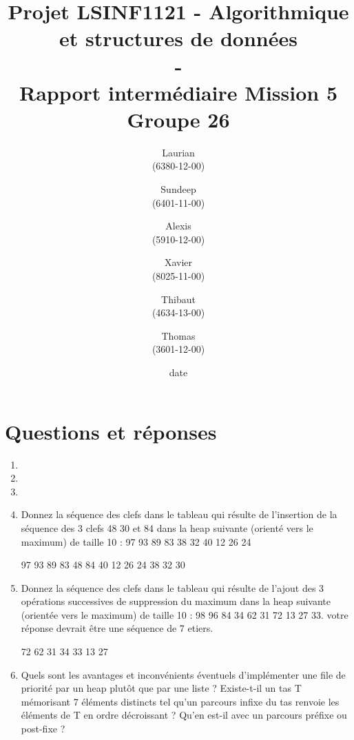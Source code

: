 \documentclass[11pt]{article}
\title{\textbf{Projet LSINF1121 -  Algorithmique et structures de données\\ - \\ Rapport intermédiaire Mission 5} \\ {\large Groupe 26}}
\author{Laurian \bsc{Detiffe} \\(6380-12-00)\and Sundeep \bsc{Dhillon} \\(6401-11-00)\and Alexis \bsc{Macq} \\ (5910-12-00) \and Xavier \bsc{Pérignon} \\ (8025-11-00)\and Thibaut \bsc{Piquard}\\(4634-13-00)\and Thomas \bsc{Wyckmans} \\ (3601-12-00)}
\date{date}
\date{\vspace*{25mm}
\texttt{[image: logo.jpg]}\\
		\vspace*{30mm}
		\begin{center}
		Année académique 2015-2016 \\	
		\end{center}}
\begin{document}
\thispagestyle{empty}

\maketitle
\thispagestyle{empty}

\section*{Questions et réponses}
\begin{enumerate}

\item
\item
\item
\item Donnez la séquence des clefs dans le tableau qui résulte de l'insertion de la séquence des 3 clefs 48 30 et 84 dans la heap suivante (orienté vers le maximum) de taille 10 : 97 93 89 83 38 32 40 12 26 24

97  93  89  83  48  84  40  12  26  24  38  32  30

\item Donnez la séquence des clefs dans le tableau qui résulte de l'ajout des 3 opérations successives de suppression du maximum dans la heap suivante (orientée vers le maximum) de taille 10 : 98 96 84 34 62 31 72 13 27 33. votre réponse devrait être une séquence de 7 etiers.

72  62  31  34  33  13  27

\item Quels sont les avantages et inconvénients éventuels d’implémenter une file de
priorité par un heap plutôt que par une liste ?
Existe-t-il un tas T mémorisant 7 éléments distincts tel qu’un parcours infixe du
tas renvoie les éléments de T en ordre décroissant ? Qu’en est-il avec un parcours
préfixe ou post-fixe ?


\end{enumerate}
\end{document}
